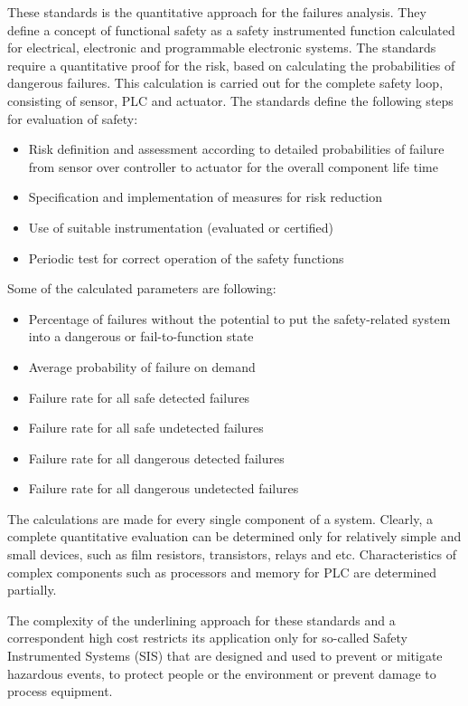 These standards is the quantitative approach for the failures analysis.  
They define a concept of functional safety as a safety instrumented
function calculated for electrical, electronic and programmable electronic systems.
The standards require a quantitative proof for the risk, based on calculating
the probabilities of dangerous failures. This calculation is carried out for the
complete safety loop, consisting of sensor, PLC and actuator. The standards
define the following steps for evaluation of safety:
\begin{itemize}
  \item Risk definition and assessment according to detailed probabilities of
  failure from sensor over controller to actuator for the overall component life
  time 
  \item Specification and implementation of measures for risk reduction
  \item Use of suitable instrumentation (evaluated or certified) 
  \item Periodic test for correct operation of the safety functions
\end{itemize}
Some of the calculated parameters are following:
\begin{itemize}
  \item Percentage of failures without the potential to put the safety-related system into a dangerous 
or fail-to-function state
  \item Average probability of failure on demand
  \item Failure rate for all safe detected failures
  \item Failure rate for all safe undetected failures
  \item Failure rate for all dangerous detected failures
  \item Failure rate for all dangerous undetected failures
\end{itemize}
The calculations are made for every single component of a system. 
Clearly, a complete quantitative evaluation can be determined only for
relatively simple and small devices, such as film resistors, transistors, relays
and etc. Characteristics of complex components such as processors and memory for
PLC are determined partially.

The complexity of the underlining approach for these standards and a
correspondent high cost restricts its application only for so-called Safety
Instrumented Systems (SIS) that are designed and used to prevent or mitigate
hazardous events, to protect people or the environment or prevent damage to
process equipment.

